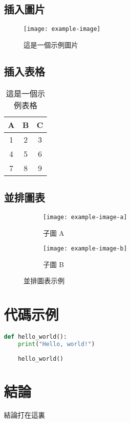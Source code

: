\documentclass{article}
\begin{document}
\subsection{插入圖片}
\begin{figure}[h]
	\centering
	\texttt{[image: example-image]} %
	\caption{這是一個示例圖片}
	\label{fig:example}
\end{figure}
	
\subsection{插入表格}
\begin{table}[h]
	\centering
	\begin{tabular}{|c|c|c|}
		\hline
		A & B & C \\
		\hline
		1 & 2 & 3 \\
		4 & 5 & 6 \\
		7 & 8 & 9 \\
		\hline
	\end{tabular}
	\caption{這是一個示例表格}
	\label{tab:example}
\end{table}
	
\subsection{並排圖表}
\begin{figure}[h]
	\centering
	\begin{subfigure}{0.45\textwidth}
		\centering
		\texttt{[image: example-image-a]} %
		\caption{子圖 A}
	\end{subfigure}
	\hfill
	\begin{subfigure}{0.45\textwidth}
		\centering
		\texttt{[image: example-image-b]} %
		\caption{子圖 B}
	\end{subfigure}
	\caption{並排圖表示例}
	\label{fig:sidebyside}
\end{figure}
	
\section{代碼示例}
\begin{lstlisting}[language=Python, caption=Python 代碼示例]
	def hello_world():
	print("Hello, world!")
	
	hello_world()
\end{lstlisting}
	
\section{結論}
結論打在這裏
	
\end{document}
